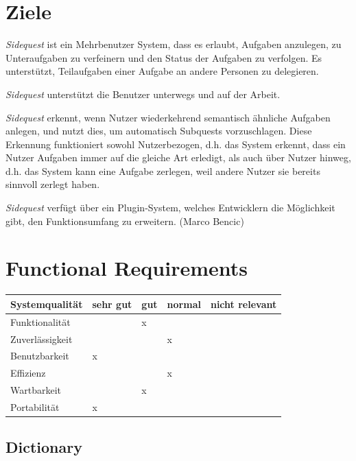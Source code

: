 \documentclass{article}
\begin{document}
\section{Ziele}

\textit{Sidequest} ist ein Mehrbenutzer System, dass es erlaubt, Aufgaben anzulegen, zu Unteraufgaben zu verfeinern und den Status der Aufgaben zu verfolgen. Es unterstützt, Teilaufgaben einer Aufgabe an andere Personen zu delegieren. 

\textit{Sidequest} unterstützt die Benutzer unterwegs und auf der Arbeit.

\textit{Sidequest} erkennt, wenn Nutzer wiederkehrend semantisch ähnliche Aufgaben anlegen, und nutzt dies, um automatisch Subquests vorzuschlagen. Diese Erkennung funktioniert sowohl Nutzerbezogen, d.h. das System erkennt, dass ein Nutzer Aufgaben immer auf die gleiche Art erledigt, als auch über Nutzer hinweg, d.h. das System kann eine Aufgabe zerlegen, weil andere Nutzer sie bereits sinnvoll zerlegt haben.

\textit{Sidequest} verfügt über ein Plugin-System, welches Entwicklern die Möglichkeit gibt, den Funktionsumfang zu erweitern. (Marco Bencic)

\section{Functional Requirements}

\begin{tabularx}{0.8\textwidth} { 
  | >{\raggedright\arraybackslash}X 
  | >{\centering\arraybackslash}X 
  | >{\centering\arraybackslash}X 
  | >{\centering\arraybackslash}X 
  | >{\raggedleft\arraybackslash}X | }
 \hline
 Systemqualität & sehr gut & gut & normal & nicht relevant \\
 \hline
 Funktionalität  &   & x &  &   \\
 \hline
 Zuverlässigkeit  &   &  & x &   \\
\hline
 Benutzbarkeit  & x  &  &  &   \\
 \hline
 Effizienz  &   &  & x &   \\
 \hline
 Wartbarkeit  &   & x &  &   \\
 \hline
 Portabilität  & x  &  &  &   \\
 \hline
\end{tabularx}

\subsection{Dictionary}
\end{document}

